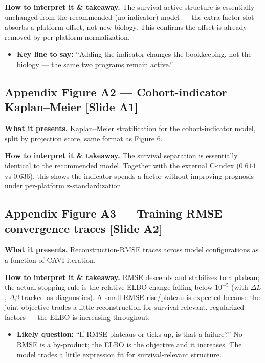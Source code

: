 \documentclass[11pt]{article}
\newcommand{\sectionlabel}[1]{\textbf{#1}}
\begin{document}
\sectionlabel{How to interpret it \& takeaway.} The survival-active structure is essentially
unchanged from the recommended (no-indicator) model --- the extra factor slot absorbs a platform
offset, not new biology. This confirms the offset is already removed by per-platform normalization.

\begin{itemize}
\item \sectionlabel{Key line to say:} ``Adding the indicator changes the bookkeeping, not the
biology --- the same two programs remain active.''
\end{itemize}

\subsection*{Appendix Figure A2 --- Cohort-indicator Kaplan--Meier [Slide A1]}
\sectionlabel{What it presents.} Kaplan--Meier stratification for the cohort-indicator model, split
by projection score, same format as Figure 6.

\sectionlabel{How to interpret it \& takeaway.} The survival separation is essentially identical to
the recommended model. Together with the external C-index ($0.614$ vs $0.636$), this shows the
indicator spends a factor without improving prognosis under per-platform z-standardization.

\subsection*{Appendix Figure A3 --- Training RMSE convergence traces [Slide A2]}
\sectionlabel{What it presents.} Reconstruction-RMSE traces across model configurations as a function
of CAVI iteration.

\sectionlabel{How to interpret it \& takeaway.} RMSE descends and stabilizes to a plateau; the actual
stopping rule is the relative ELBO change falling below $10^{-5}$ (with $\Delta L$, $\Delta\beta$
tracked as diagnostics). A small RMSE rise/plateau is expected because the joint objective trades a
little reconstruction for survival-relevant, regularized factors --- the ELBO is increasing
throughout.

\begin{itemize}
\item \sectionlabel{Likely question:} ``If RMSE plateaus or ticks up, is that a failure?'' No --- RMSE
is a by-product; the ELBO is the objective and it increases. The model trades a little expression fit
for survival-relevant structure.
\end{itemize}
\end{document}
